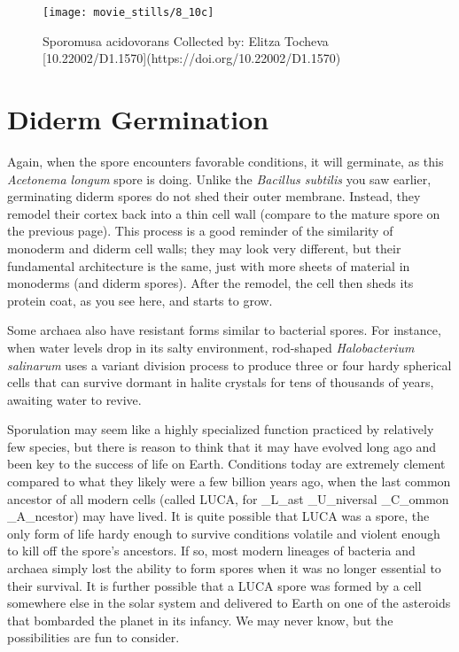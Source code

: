 \documentclass[]{tufte-book}
\begin{document}
\begin{figure}
\texttt{[image: movie\_stills/8\_10c]} \caption[Sporomusa acidovorans Collected by]{Sporomusa acidovorans Collected by: Elitza Tocheva [10.22002/D1.1570](https://doi.org/10.22002/D1.1570)}\label{fig:unnamed-chunk-149}
\end{figure}

\section{Diderm Germination}\label{diderm-germination}

Again, when the spore encounters favorable conditions, it will
germinate, as this \emph{Acetonema longum} spore is doing. Unlike the
\emph{Bacillus subtilis} you saw earlier, germinating diderm spores do
not shed their outer membrane. Instead, they remodel their cortex back
into a thin cell wall (compare to the mature spore on the previous
page). This process is a good reminder of the similarity of monoderm and
diderm cell walls; they may look very different, but their fundamental
architecture is the same, just with more sheets of material in monoderms
(and diderm spores). After the remodel, the cell then sheds its protein
coat, as you see here, and starts to grow.

Some archaea also have resistant forms similar to bacterial spores. For
instance, when water levels drop in its salty environment, rod-shaped
\emph{Halobacterium salinarum} uses a variant division process to
produce three or four hardy spherical cells that can survive dormant in
halite crystals for tens of thousands of years, awaiting water to
revive.

Sporulation may seem like a highly specialized function practiced by
relatively few species, but there is reason to think that it may have
evolved long ago and been key to the success of life on Earth.
Conditions today are extremely clement compared to what they likely were
a few billion years ago, when the last common ancestor of all modern
cells (called LUCA, for \_L\_ast \_U\_niversal \_C\_ommon \_A\_ncestor)
may have lived. It is quite possible that LUCA was a spore, the only
form of life hardy enough to survive conditions volatile and violent
enough to kill off the spore's ancestors. If so, most modern lineages of
bacteria and archaea simply lost the ability to form spores when it was
no longer essential to their survival. It is further possible that a
LUCA spore was formed by a cell somewhere else in the solar system and
delivered to Earth on one of the asteroids that bombarded the planet in
its infancy. We may never know, but the possibilities are fun to
consider.
\end{document}

